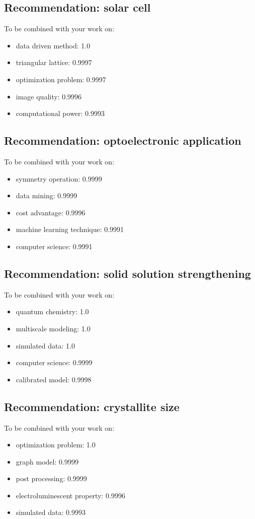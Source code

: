 \documentclass{article}%
\begin{document}
%
\subsection{Recommendation: solar cell}%
\label{subsec:Recommendationsolarcell}%
To be combined with your work on:%
\begin{itemize}%
\item%
data driven method: 1.0%
\item%
triangular lattice: 0.9997%
\item%
optimization problem: 0.9997%
\item%
image quality: 0.9996%
\item%
computational power: 0.9993%
\end{itemize}

%
\subsection{Recommendation: optoelectronic application}%
\label{subsec:Recommendationoptoelectronicapplication}%
To be combined with your work on:%
\begin{itemize}%
\item%
symmetry operation: 0.9999%
\item%
data mining: 0.9999%
\item%
cost advantage: 0.9996%
\item%
machine learning technique: 0.9991%
\item%
computer science: 0.9991%
\end{itemize}

%
\subsection{Recommendation: solid solution strengthening}%
\label{subsec:Recommendationsolidsolutionstrengthening}%
To be combined with your work on:%
\begin{itemize}%
\item%
quantum chemistry: 1.0%
\item%
multiscale modeling: 1.0%
\item%
simulated data: 1.0%
\item%
computer science: 0.9999%
\item%
calibrated model: 0.9998%
\end{itemize}

%
\subsection{Recommendation: crystallite size}%
\label{subsec:Recommendationcrystallitesize}%
To be combined with your work on:%
\begin{itemize}%
\item%
optimization problem: 1.0%
\item%
graph model: 0.9999%
\item%
post processing: 0.9999%
\item%
electroluminescent property: 0.9996%
\item%
simulated data: 0.9993%
\end{itemize}
\end{document}
